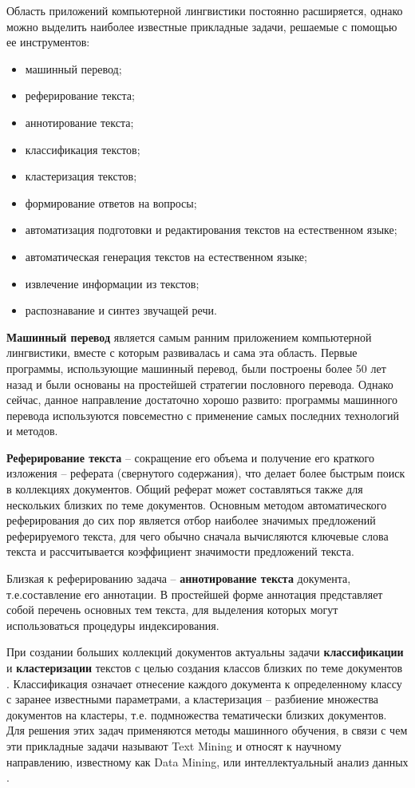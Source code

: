 Область приложений компьютерной лингвистики постоянно расширяется, однако можно выделить наиболее известные прикладные задачи, решаемые с помощью ее инструментов\cite{Posobie}:
\begin{itemize}
	\item машинный перевод;
	\item реферирование текста;
	\item аннотирование текста;
	\item классификация текстов;
	\item кластеризация текстов;
	\item формирование ответов на вопросы;
	\item автоматизация подготовки и редактирования текстов на естественном языке;
	\item автоматическая генерация текстов на естественном языке;
	\item извлечение информации из текстов;
	\item распознавание и синтез звучащей речи.
\end{itemize}

\textbf{Машинный перевод} \cite{machine-translation} является самым ранним приложением компьютерной лингвистики, вместе с которым развивалась и сама эта область. Первые программы, использующие машинный перевод, были построены более 50 лет назад и были основаны на простейшей стратегии пословного перевода. Однако сейчас, данное направление достаточно хорошо развито: программы машинного перевода используются повсеместно с применение самых последних технологий и методов.

\textbf{Реферирование текста} – сокращение его объема и получение его краткого изложения – реферата (свернутого содержания), что делает более быстрым поиск в коллекциях документов. Общий реферат может составляться также для нескольких близких по теме документов. Основным методом автоматического реферирования до сих пор является отбор наиболее значимых предложений реферируемого текста, для чего обычно сначала вычисляются ключевые слова текста и рассчитывается коэффициент значимости предложений текста.

Близкая к реферированию задача – \textbf{аннотирование текста} документа, т.е.составление его аннотации. В простейшей форме аннотация представляет собой перечень основных тем текста, для выделения которых могут использоваться процедуры индексирования.

При создании больших коллекций документов актуальны задачи
\textbf{классификации} и \textbf{кластеризации} текстов с целью создания классов близких по теме документов \cite{vasiliev-krivenko}. Классификация означает отнесение каждого документа к определенному классу с заранее известными параметрами, а кластеризация – разбиение множества документов на кластеры, т.е. подмножества тематически близких документов. Для решения этих задач применяются методы машинного обучения, в связи с чем эти прикладные задачи называют Text Mining и относят к научному направлению, известному как Data Mining, или интеллектуальный анализ данных \cite{data-mining}.

